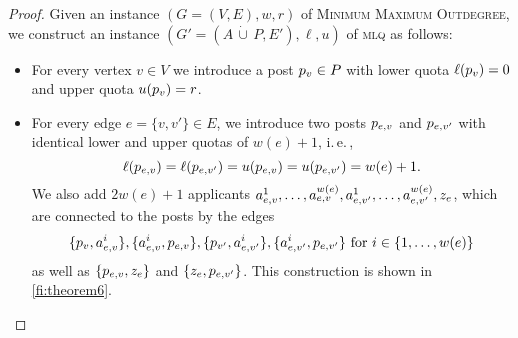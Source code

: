\documentclass{llncs}
\begin{document}
\begin{proof}
  Given an instance $(G = (V, E), w, r)$ of \textsc{Minimum Maximum Outdegree}, we construct an instance $(G' = (A\,\dot\cup\, P, E'), \ell, u)$ of \textsc{mlq} as follows:
  \begin{itemize}
   \item For every vertex $v \in V$ we introduce a post $\nodepost{v} \in P$ with lower quota $\ell(\nodepost{v}) = 0$ and upper quota $u(\nodepost{v}) = r$. 
   \item For every edge $e = \{v, v'\} \in E$, we introduce two posts $\edgestartpost{e}{v}$ and $\edgeendpost{e}{v'}$ with identical lower and upper quotas of $w(e)+1$, i.\,e.\,, 
   $$\ell(\edgestartpost{e}{v}) = \ell(\edgeendpost{e}{v'}) = u(\edgestartpost{e}{v}) = u(\edgeendpost{e}{v'}) = w(e) + 1.$$
   We also add $2w(e) + 1$ applicants $ \edgestartapp{e}{v}{1}, \dots,  \edgestartapp{e}{v}{w(e)}, \edgeendapp{e}{v'}{1}, \dots, \edgeendapp{e}{v'}{w(e)}, \edgeapp{e}$, 
   which are connected to the posts by the edges 
   $$\{\nodepost{v}, \edgestartapp{e}{v}{i} \}, \{ \edgestartapp{e}{v}{i}, \edgestartpost{e}{v}\}, \{\nodepost{v'}, \edgeendapp{e}{v'}{i}\}, \{\edgeendapp{e}{v'}{i}, \edgeendpost{e}{v'}\} \text{ for } i \in \{1, \dots, w(e)\}$$ as well as $\{\edgestartpost{e}{v},  \edgeapp{e}\}$ and $\{ \edgeapp{e}, \edgeendpost{e}{v'}\}$. This construction is shown in \cref{fi:theorem6}.
  \end{itemize}

\begin{figure}[htbp]
\centering
{}
\end{figure}
\end{proof}
\end{document}

